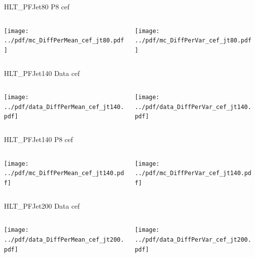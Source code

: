 \documentclass[9pt]{beamer}
\begin{document}
\begin{frame}[t]{HLT\_PFJet80 P8 cef}
\begin{columns}[T]
  \begin{column}{.5\textwidth}
  \texttt{[image: ../pdf/mc\_DiffPerMean\_cef\_jt80.pdf]}
  \end{column}
  \begin{column}{.5\textwidth}
  \texttt{[image: ../pdf/mc\_DiffPerVar\_cef\_jt80.pdf]}
  \end{column}
\end{columns}
\end{frame}

\begin{frame}[t]{HLT\_PFJet140 Data cef}
\begin{columns}[T]
  \begin{column}{.5\textwidth}
  \texttt{[image: ../pdf/data\_DiffPerMean\_cef\_jt140.pdf]}
  \end{column}
  \begin{column}{.5\textwidth}
  \texttt{[image: ../pdf/data\_DiffPerVar\_cef\_jt140.pdf]}
  \end{column}
\end{columns}
\end{frame}

\begin{frame}[t]{HLT\_PFJet140 P8 cef}
\begin{columns}[T]
  \begin{column}{.5\textwidth}
  \texttt{[image: ../pdf/mc\_DiffPerMean\_cef\_jt140.pdf]}
  \end{column}
  \begin{column}{.5\textwidth}
  \texttt{[image: ../pdf/mc\_DiffPerVar\_cef\_jt140.pdf]}
  \end{column}
\end{columns}
\end{frame}

\begin{frame}[t]{HLT\_PFJet200 Data cef}
\begin{columns}[T]
  \begin{column}{.5\textwidth}
  \texttt{[image: ../pdf/data\_DiffPerMean\_cef\_jt200.pdf]}
  \end{column}
  \begin{column}{.5\textwidth}
  \texttt{[image: ../pdf/data\_DiffPerVar\_cef\_jt200.pdf]}
  \end{column}
\end{columns}
\end{frame}
\end{document}
